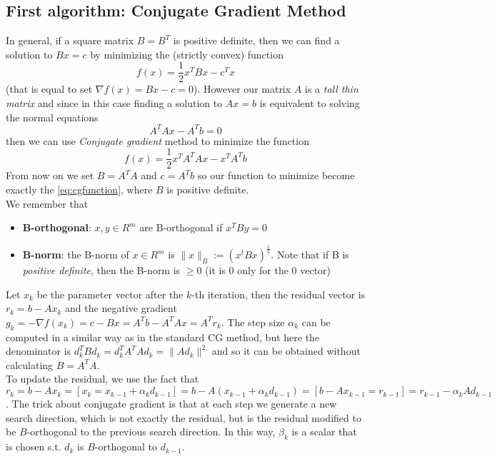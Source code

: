 \documentclass{article}
\begin{document}
\subsection{First algorithm: Conjugate Gradient Method}\label{subsec:conjugate-gradient-method}
In general, if a square matrix $B = B^{T}$ is positive definite, then we can find a solution to $Bx = c$ by minimizing the (strictly convex) function 
\[
f(x) = \frac{1}{2}x^{T}Bx - c^{T}x \tag{1} \label{eq:cgfunction}
\]
(that is equal to set $\nabla f(x) = Bx - c = 0$). However our matrix $A$ is a \emph{tall thin matrix} and since in this case finding a solution to  $Ax = b$ is equivalent to solving the normal equations
\[
A^{T}Ax - A^{T}b = 0
\]
then we can use \textit{Conjugate gradient} method to minimize the function
\[
f(x) = \frac{1}{2}x^{T}A^{T}Ax - x^{T}A^{T}b
\]
From now on we set $B = A^{T}A$ and $c = A^{T}b$ so our function to minimize become exactly the \eqref{eq:cgfunction}, where $B$ is positive definite. 
\\We remember that \begin{itemize}
\item \textbf{B-orthogonal}: $x, y \in R^{m}$ are B-orthogonal if $x^{T}By = 0$
\item \textbf{B-norm}: the B-norm of $x \in R^{m}$ is $\|x\|_{B} := (x^{t}Bx)^{\frac{1}{2}}$. Note that if B is \textit{positive definite}, then the B-norm is $\geq 0$ (it is $0$ only for the $0$ vector)
\end{itemize}
Let $x_{k}$ be the parameter vector after the $k$-th iteration, then the residual vector is $r_{k} = b - Ax_{k}$ and the negative gradient $g_{k} = -\nabla f(x_{k}) = c - Bx = A^{T}b - A^{T}Ax = A^{T}r_{k}$. The step size $\alpha_{k}$ can be computed in a similar way as in the standard CG method, but here the denominator is $d_{k}^{T}Bd_k= d_{k}^{T}A^{T}Ad_k = \|Ad_{k}\|^2$ and so it can be obtained without calculating $B = A^{T}A$.
\\To update the residual, we use the fact that $r_{k} = b - Ax_{k} = [x_{k} = x_{k-1} + \alpha_{k}d_{k-1}] = b - A(x_{k-1} + \alpha_{k}d_{k-1}) = [b-Ax_{k-1} = r_{k-1}] = r_{k-1} - \alpha_{k}Ad_{k-1}$. The trick about conjugate gradient is that at each step we generate a new search direction, which is not exactly the residual, but is the residual modified to be $B$-orthogonal to the previous search direction. In this way, $\beta_{k}$ is a scalar that is chosen s.t. $d_{k}$ is $B$-orthogonal to $d_{k-1}$.
\end{document}
